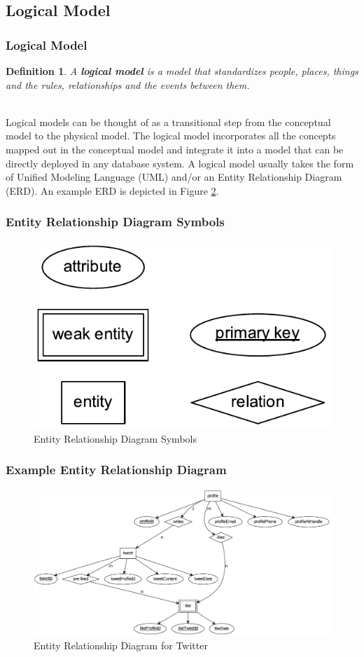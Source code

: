 \documentclass[aspectratio=169]{beamer}
\newtheorem{defn}{Definition}
\begin{document}
\subsection{Logical Model}
\begin{frame}
\frametitle{Logical Model}
\begin{defn}
A \textbf{logical model} is a model that standardizes people, places, things and the rules, relationships and the events between them.
\end{defn}
\pause
\mbox{}\\
Logical models can be thought of as a transitional step from the conceptual model to the physical model. The logical model incorporates all the concepts mapped out in the conceptual model and integrate it into a model that can be directly deployed in any database system. A logical model usually takes the form of Unified Modeling Language (UML) and/or an Entity Relationship Diagram (ERD). An example ERD is depicted in Figure \ref{fig:erd}.
\end{frame}

\begin{frame}
\frametitle{Entity Relationship Diagram Symbols}
\begin{figure}
\includegraphics{../artifacts/blank-erd.pdf}
\caption{Entity Relationship Diagram Symbols}
\label{fig:erd}
\end{figure}
\end{frame}

\begin{frame}
\frametitle{Example Entity Relationship Diagram}
\begin{figure}
\includegraphics[scale=0.333333333]{../artifacts/twitter-erd.pdf}
\caption{Entity Relationship Diagram for Twitter}
\label{fig:erd}
\end{figure}
\end{frame}
\end{document}
